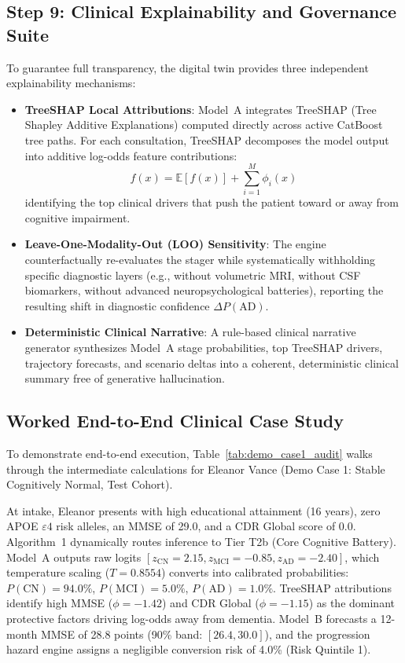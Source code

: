 \documentclass[11pt,a4paper]{article}
\begin{document}
\subsection{Step 9: Clinical Explainability and Governance Suite}
\label{sec:method_explain}
To guarantee full transparency, the digital twin provides three independent explainability mechanisms:
\begin{itemize}
    \item \textbf{TreeSHAP Local Attributions}: Model~A integrates TreeSHAP (Tree Shapley Additive Explanations) computed directly across active CatBoost tree paths. For each consultation, TreeSHAP decomposes the model output into additive log-odds feature contributions:
    \begin{equation}
        f(x) = \mathbb{E}[f(x)] + \sum_{i=1}^M \phi_i(x)
        \label{eq:shap_decomposition}
    \end{equation}
    identifying the top clinical drivers that push the patient toward or away from cognitive impairment.
    \item \textbf{Leave-One-Modality-Out (LOO) Sensitivity}: The engine counterfactually re-evaluates the stager while systematically withholding specific diagnostic layers (e.g., without volumetric MRI, without CSF biomarkers, without advanced neuropsychological batteries), reporting the resulting shift in diagnostic confidence $\Delta P(\text{AD})$.
    \item \textbf{Deterministic Clinical Narrative}: A rule-based clinical narrative generator synthesizes Model~A stage probabilities, top TreeSHAP drivers, trajectory forecasts, and scenario deltas into a coherent, deterministic clinical summary free of generative hallucination.
\end{itemize}

\subsection{Worked End-to-End Clinical Case Study}
\label{sec:method_worked_example}
To demonstrate end-to-end execution, Table~\ref{tab:demo_case1_audit} walks through the intermediate calculations for Eleanor Vance (Demo Case 1: Stable Cognitively Normal, Test Cohort).



At intake, Eleanor presents with high educational attainment (16 years), zero APOE $\varepsilon4$ risk alleles, an MMSE of 29.0, and a CDR Global score of 0.0. Algorithm~1 dynamically routes inference to Tier T2b (Core Cognitive Battery). Model~A outputs raw logits $[z_{\text{CN}} = 2.15, z_{\text{MCI}} = -0.85, z_{\text{AD}} = -2.40]$, which temperature scaling ($T = 0.8554$) converts into calibrated probabilities: $P(\text{CN}) = 94.0\%$, $P(\text{MCI}) = 5.0\%$, $P(\text{AD}) = 1.0\%$. TreeSHAP attributions identify high MMSE ($\phi = -1.42$) and CDR Global ($\phi = -1.15$) as the dominant protective factors driving log-odds away from dementia. Model~B forecasts a 12-month MMSE of 28.8 points (90\% band: $[26.4, 30.0]$), and the progression hazard engine assigns a negligible conversion risk of 4.0\% (Risk Quintile 1).
\end{document}
